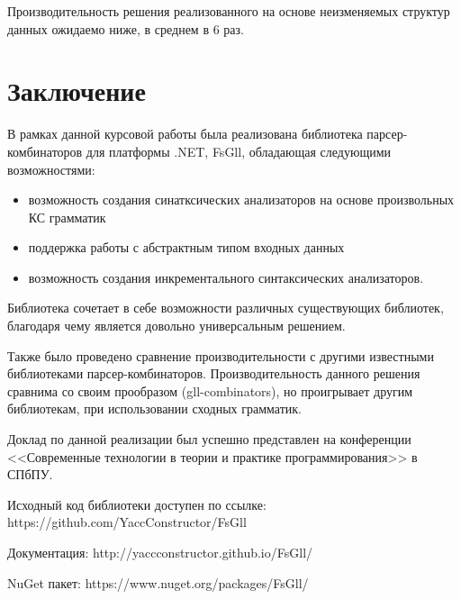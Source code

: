 \documentclass[14pt]{matmex-diploma}
\begin{document}
Производительность решения реализованного на основе неизменяемых структур данных ожидаемо ниже, 
в среднем в 6 раз.



\section*{Заключение}
В рамках данной курсовой работы была реализована библиотека парсер-комбинаторов 
для платформы .NET, FsGll, обладающая следующими возможностями:
\begin{itemize}
    \item возможность создания синатксических анализаторов на основе произвольных КС грамматик
    \item поддержка работы с абстрактным типом входных данных 
    \item возможность создания инкрементального синтаксических анализаторов.
\end{itemize}

Библиотека сочетает в себе возможности различных существующих библиотек, 
благодаря чему является довольно универсальным решением. 

Также было проведено сравнение производительности с другими известными библиотеками парсер-комбинаторов.
Производительность данного решения сравнима со своим прообразом (gll-combinators), 
но проигрывает другим библиотекам, при использовании сходных грамматик.

Доклад по данной реализации был успешно представлен на конференции 
<<Современные технологии в теории и практике программирования>> в СПбПУ.

Исходный код библиотеки доступен по ссылке: https://github.com/YaccConstructor/FsGll

Документация: http://yaccconstructor.github.io/FsGll/

NuGet пакет: https://www.nuget.org/packages/FsGll/




\setmonofont[Mapping=tex-text]{CMU Typewriter Text}


\end{document}
